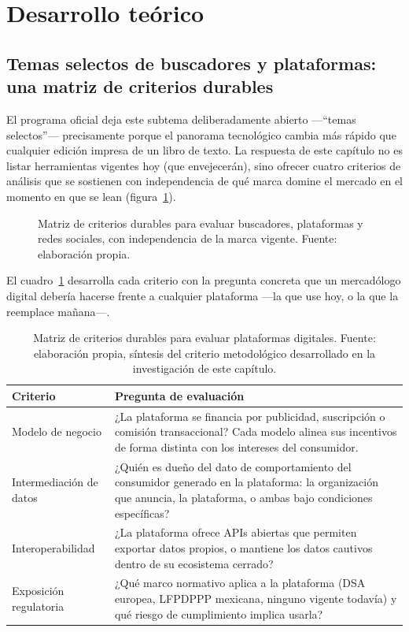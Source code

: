 \section{Desarrollo teórico}

\subsection{Temas selectos de buscadores y plataformas: una matriz de criterios durables}

El programa oficial deja este subtema deliberadamente abierto
—\enquote{temas selectos}— precisamente porque el panorama tecnológico cambia
más rápido que cualquier edición impresa de un libro de texto. La respuesta
de este capítulo no es listar herramientas vigentes hoy (que envejecerán),
sino ofrecer cuatro criterios de análisis que se sostienen con independencia
de qué marca domine el mercado en el momento en que se lean
(figura~\ref{fig:cap04-criterios}).

\begin{figure}[!htb]
  \centering
  
  \caption{Matriz de criterios durables para evaluar buscadores, plataformas
  y redes sociales, con independencia de la marca vigente. Fuente:
  elaboración propia.}
  \label{fig:cap04-criterios}
\end{figure}

El cuadro~\ref{tab:cap04-criterios} desarrolla cada criterio con la pregunta
concreta que un mercadólogo digital debería hacerse frente a cualquier
plataforma —la que use hoy, o la que la reemplace mañana—.

\begin{table}[!htb]
\centering
\begin{tabular}{@{}p{3.3cm}p{9.1cm}@{}}
\toprule
Criterio & Pregunta de evaluación \\
\midrule
Modelo de negocio & ¿La plataforma se financia por publicidad, suscripción o comisión transaccional? Cada modelo alinea sus incentivos de forma distinta con los intereses del consumidor. \\
Intermediación de datos & ¿Quién es dueño del dato de comportamiento del consumidor generado en la plataforma: la organización que anuncia, la plataforma, o ambas bajo condiciones específicas? \\
Interoperabilidad & ¿La plataforma ofrece APIs abiertas que permiten exportar datos propios, o mantiene los datos cautivos dentro de su ecosistema cerrado? \\
Exposición regulatoria & ¿Qué marco normativo aplica a la plataforma (DSA europea, LFPDPPP mexicana, ninguno vigente todavía) y qué riesgo de cumplimiento implica usarla? \\
\bottomrule
\end{tabular}
\caption{Matriz de criterios durables para evaluar plataformas digitales.
Fuente: elaboración propia, síntesis del criterio metodológico desarrollado
en la investigación de este capítulo.}
\label{tab:cap04-criterios}
\end{table}

